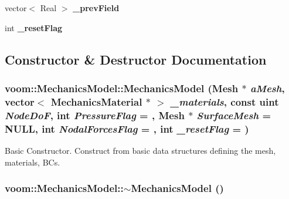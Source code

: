 \begin{DoxyCompactItemize}
\item 
\hypertarget{classvoom_1_1_mechanics_model_ad91ef4d69cdf51ea0a58ff9cde8e8fbb}{
vector$<$ Real $>$ {\bfseries \_\-prevField}}
\label{classvoom_1_1_mechanics_model_ad91ef4d69cdf51ea0a58ff9cde8e8fbb}

\item 
\hypertarget{classvoom_1_1_mechanics_model_a8751b1a88f45dc3e93b0c6e59d382c9a}{
int {\bfseries \_\-resetFlag}}
\label{classvoom_1_1_mechanics_model_a8751b1a88f45dc3e93b0c6e59d382c9a}

\end{DoxyCompactItemize}


\subsection{Constructor \& Destructor Documentation}
\hypertarget{classvoom_1_1_mechanics_model_add7088e6811b40dbfe55e32552fc2a10}{
\subsubsection[{MechanicsModel}]{\setlength{\rightskip}{0pt plus 5cm}voom::MechanicsModel::MechanicsModel ({\bf Mesh} $\ast$ {\em aMesh}, \/  vector$<$ {\bf MechanicsMaterial} $\ast$ $>$ {\em \_\-materials}, \/  const uint {\em NodeDoF}, \/  int {\em PressureFlag} = {}, \/  {\bf Mesh} $\ast$ {\em SurfaceMesh} = {\ttfamily NULL}, \/  int {\em NodalForcesFlag} = {}, \/  int {\em \_\-resetFlag} = {})}}
\label{classvoom_1_1_mechanics_model_add7088e6811b40dbfe55e32552fc2a10}


Basic Constructor. Construct from basic data structures defining the mesh, materials, BCs. \hypertarget{classvoom_1_1_mechanics_model_a39cab4fab5f26d8bf83e63a6d91e33f6}{
\subsubsection[{$\sim$MechanicsModel}]{\setlength{\rightskip}{0pt plus 5cm}voom::MechanicsModel::$\sim$MechanicsModel ()}}
\label{classvoom_1_1_mechanics_model_a39cab4fab5f26d8bf83e63a6d91e33f6}


